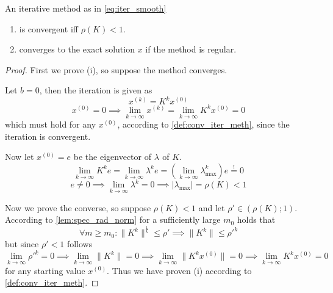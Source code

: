 \begin{theorem}\label{thm:spec_rad_conv}
   An iterative method as in \cref{eq:iter_smooth}
   \begin{enumerate}[label=\roman*, align=Center]
      \item is convergent iff \(\rho(K) < 1\).
      \item converges to the exact solution \(x\) if the method is regular.
   \end{enumerate}
\end{theorem}
\begin{proof}
   First we prove (i), so suppose the method converges.

   Let \(b = 0\), then the iteration is given as
   \[x^{(k)} = K^k x^{(0)}\]
   \[x^{(0)} = 0 \implies \lim_{k \to \infty} x^{(k)} = \lim_{k \to \infty} K^k x^{(0)} = 0\]
   which must hold for any \(x^{(0)}\), according to \cref{def:conv_iter_meth}, since the iteration is convergent.

   Now let \(x^{(0)} = e\) be the eigenvector of \(\lambda_{}\) of \(K\).
   \[\lim_{k \to \infty} K^k e = \lim_{k \to \infty} \lambda_{}^k e = \left(\lim_{k \to \infty} \lambda_{\max}^k \right) e \overset{!}{=} 0\]
   \[e \neq 0 \implies \lim_{k \to \infty} \lambda_{}^k = 0 \implies |\lambda_{\max}| = \rho(K) < 1\]

   Now we prove the converse, so suppose \(\rho(K) < 1\) and let \(\rho' \in (\rho(K); 1)\).
   According to \cref{lem:spec_rad_norm} for a sufficiently large \(m_0\) holds that
   \[\forall m \geq m_0: \|K^k\|^\frac{1}{k} \leq \rho' \implies \|K^k\| \leq \rho'^k\]
   but since \(\rho' < 1\) follows
   \[\lim_{k \to \infty} \rho'^k = 0 \implies \lim_{k \to \infty} \|K^k\| = 0 \implies \lim_{k \to \infty} \|K^k x^{(0)}\| = 0 \implies \lim_{k \to \infty} K^kx^{(0)} = 0\]
   for any starting value \(x^{(0)}\).
   Thus we have proven (i) according to \cref{def:conv_iter_meth}.


\end{proof}
